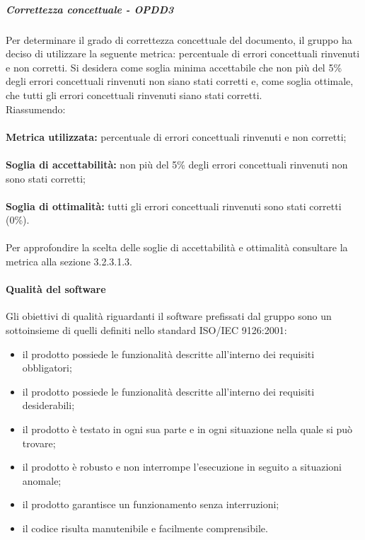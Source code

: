 \documentclass[PianoDiQualifica.tex]{subfiles}
\begin{document}
				\subparagraph{Correttezza concettuale - OPDD3}
				Per determinare il grado di correttezza concettuale del documento, il gruppo ha deciso di utilizzare la seguente metrica: percentuale di errori concettuali rinvenuti e non corretti.
				Si desidera come soglia minima accettabile che non più del 5\% degli errori concettuali rinvenuti non siano stati corretti e, come soglia ottimale, che tutti gli errori
				concettuali rinvenuti siano stati corretti.\\
				Riassumendo: \\ \\
				\textbf{Metrica utilizzata:} percentuale di errori concettuali rinvenuti e non corretti; \\ \\
				\textbf{Soglia di accettabilità:} non più del 5\% degli errori concettuali rinvenuti non sono stati corretti;\\ \\
				\textbf{Soglia di ottimalità:} tutti gli errori concettuali rinvenuti sono stati corretti (0\%). \\ \\
				Per approfondire la scelta delle soglie di accettabilità e ottimalità consultare la metrica alla sezione 3.2.3.1.3.
				
			\paragraph{Qualità del software}
			Gli obiettivi di qualità riguardanti il software prefissati dal gruppo \GRUPPO{} sono un sottoinsieme di quelli definiti nello standard ISO/IEC 9126:2001:
			\begin{itemize}
				\item il prodotto possiede le funzionalità descritte all’interno dei requisiti obbligatori;
				\item il prodotto possiede le funzionalità descritte all’interno dei requisiti desiderabili;
				\item il prodotto è testato in ogni sua parte e in ogni situazione nella quale si può trovare;
				\item il prodotto è robusto e non interrompe l’esecuzione in seguito a situazioni anomale;
				\item il prodotto garantisce un funzionamento senza interruzioni;
				\item il codice risulta manutenibile e facilmente comprensibile.
			\end{itemize}
			
\end{document}
